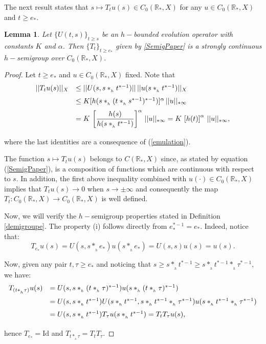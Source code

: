 \documentclass[10pt]{amsart}
\newtheorem{lemma}{Lemma}
\numberwithin{equation}{section}
\begin{document}
The next result states that $s\mapsto T_{t}u(s) \in C_{0}(\mathbb{R}_{*},X)$ for any
$u\in  C_{0}(\mathbb{R}_{*},X)$ and $t\geq e_{*}$.

\begin{lemma}\label{C0semigroup}
  Let $\{U(t,s)\}_{t\ge s }$ be an $h-$bounded evolution operator with constants $K$ and $\alpha$. Then $\{T_t\}_{t \ge e_*}$ given by \eqref{SemigPaper} 
  is a strongly continuous $h-$semigroup over  $C_0(\mathbb{R}_*, X).$
  \end{lemma}

\begin{proof}
 Let $t \ge e_*$ and $u \in C_0(\mathbb{R}_*, X)$ fixed. Note that
 $$
 \begin{array}{rl}
 \medskip
 ||T_tu(s)||_X &   \le ||U(s, s*_{_h}t^{*-1})|| \,  ||u(s*_{_h}t^{*-1})||_X \\
 \medskip
      & \le K [h(s*_{_h}(t*_{_h}s^{*-1})^{*-1})]^\alpha \, ||u||_{*\infty} \\
      \medskip
& = K \displaystyle \, \left[ \frac{h(s)}{h(s*_{_h}t^{*-1})}\right]^\alpha \, ||u||_{*\infty}  = K \displaystyle \, \left[h(t)\right]^\alpha \, ||u||_{*\infty},
      \end{array}
 $$ 
where the last identities are a consequence of (\ref{emulation}). 

The function  $s\mapsto T_{t}u(s)$ belongs to $C(\mathbb{R}_{*},X)$ since, as stated by equation (\ref{SemigPaper}),
is a composition of functions which are continuous with respect to $s$. In addition, the first above inequality  combined with $u(\cdot)\in C_{0}(\mathbb{R}_*, X)$ implies that $T_tu(s) \to 0$ when $s \to \pm \infty$ and consequently the map $T_t: C_0(\mathbb{R}_*, X) \to C_0(\mathbb{R}_*, X) $ is well defined.  

Now, we will verify the $h-$semigroup properties stated in Definition \ref{demigroupe}. The property (i) follows
directly from $e_{*}^{*-1}=e_{*}$. Indeed, notice that:
\begin{displaymath}
T_{e_*} u(s) = U(s,s*_{_h}e_*) u(s*_{_h}e_*) = U(s,s) u(s) = u(s).
\end{displaymath}

Now, given any pair $t, \tau \ge e_*$ and noticing that   $s \ge s*_{_h}t^{*-1} \ge s*_{_h}t^{*-1}*_{_h} \tau^{*-1},$ we have: 
$$\begin{array}{rl} 
\medskip T_{(t*_{_h}\tau)} u(s) & = U(s,s*_{_h}(t*_{_h}\tau)^{*-1}) u(s*_{_h}(t*_{_h}\tau)^{*-1})\\
\medskip 
& = U(s,s*_{_h}t^{*-1}) U(s*_{_h}t^{*-1},s*_{_h}t^{*-1}*_{_h}\tau^{*-1}) u(s*_{_h} t^{*-1}*_{_h}\tau^{*-1})\\
\medskip
& =  U(s,s*_{_h}t^{*-1}) T_\tau u(s*_{_h}t^{*-1}) = T_t T_\tau u(s),
\end{array} 
$$   
hence $T_{e_*} = \mathrm{Id}$ and $T_{t*_{_h}\tau} = T_tT_\tau.$ 


\end{proof}
\end{document}
